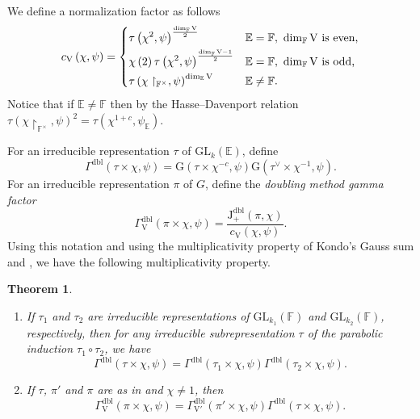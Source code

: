 \documentclass[12pt, reqno]{amsart}
\newtheorem{theorem}{Theorem}[section]
\theoremstyle{definition}
\theoremstyle{definition}
\theoremstyle{definition}
\newcommand{\multiplicativegroup}[1]{#1^{\times}}
\newcommand{\hermitianSpace}{\mathrm{V}}
\newcommand{\fieldCharacter}{\psi}
\newcommand{\Contragradient}[1]{#1^{\vee}}
\newcommand{\minusInvolution}[1]{#1^{-c}}
\newcommand{\involutionPlusOne}[1]{#1^{1+c}}
\newcommand{\GL}{\mathrm{GL}}
\newcommand{\finiteField}{\mathbb{F}}
\newcommand{\quadraticExtension}{\mathbb{E}}
\newcommand{\GaussSumScalar}[2]{\mathrm{G}\left(#1, #2\right)}
\newcommand{\posDblJacobiSumScalar}[2]{\mathrm{J}_{+}^{\mathrm{dbl}}\left(#1, #2\right)}
\newcommand{\dblGammaFactor}[3]{\Gamma^{\mathrm{dbl}}\left(#1 \times #2, #3\right)}
\newcommand{\dblGammaFactorSpace}[4]{\Gamma^{\mathrm{dbl}}_{#1}\left(#2 \times #3, #4\right)}
\begin{document}
We define a normalization factor as follows $$c_{\hermitianSpace}\left(\chi, \fieldCharacter\right) = \begin{dcases}
	\tau\left(\chi^2, \fieldCharacter\right)^{\frac{\dim_{\finiteField} \hermitianSpace}{2}} & \quadraticExtension = \finiteField,\,\, \dim_{\finiteField} \hermitianSpace \text{ is even,}\\
	\chi\left(2\right) \tau\left(\chi^2, \fieldCharacter\right)^{\frac{\dim_{\finiteField} \hermitianSpace - 1}{2}} & \quadraticExtension = \finiteField,\,\, \dim_{\finiteField} \hermitianSpace \text{ is odd,}	\\
	\tau\left(\chi\restriction_{\multiplicativegroup{\finiteField}}, \fieldCharacter\right)^{\dim_{\quadraticExtension} \hermitianSpace} & \quadraticExtension \ne \finiteField.
\end{dcases}$$
Notice that if $\quadraticExtension \ne \finiteField$ then by the Hasse--Davenport relation $\tau\left(\chi\restriction_{\multiplicativegroup{\finiteField}}, \fieldCharacter\right)^{2} = \tau\left(\involutionPlusOne{\chi}, \fieldCharacter_{\quadraticExtension}\right)$.

For an irreducible representation  $\tau$ of $\GL_k\left(\quadraticExtension\right)$, define $$\dblGammaFactor{\tau}{\chi}{\fieldCharacter} = \GaussSumScalar{\tau \times \minusInvolution{\chi}}{\fieldCharacter} \GaussSumScalar{\Contragradient{\tau} \times \chi^{-1}}{\fieldCharacter}.$$
For an irreducible representation $\pi$ of $G$, define the \emph{doubling method gamma factor} $$\dblGammaFactorSpace{\hermitianSpace}{\pi}{\chi}{\fieldCharacter} = \frac{\posDblJacobiSumScalar{\pi}{\chi}}{c_{\hermitianSpace}\left(\chi, \fieldCharacter\right)}.$$
Using this notation and using the multiplicativity property of Kondo's Gauss sum and , we have the following multiplicativity property.

\begin{theorem}\label{thm:multiplicativity-in-terms-of-gamma-factors}
	\begin{enumerate}
		\item If $\tau_1$ and $\tau_2$ are irreducible representations of $\GL_{k_1}\left(\finiteField\right)$ and $\GL_{k_2}\left(\finiteField\right)$, respectively, then for any irreducible subrepresentation $\tau$ of the parabolic induction $\tau_1 \circ \tau_2$, we have
		$$\dblGammaFactor{\tau}{\chi}{\fieldCharacter} = \dblGammaFactor{\tau_1}{\chi}{\fieldCharacter} \dblGammaFactor{\tau_2}{\chi}{\fieldCharacter}.$$
		\item If $\tau$, $\pi'$ and $\pi$ are as in  and $\chi \ne 1$, then
		$$\dblGammaFactorSpace{\hermitianSpace}{\pi}{\chi}{\fieldCharacter} = \dblGammaFactorSpace{\hermitianSpace'}{\pi'}{\chi}{\fieldCharacter} \dblGammaFactor{\tau}{\chi}{\fieldCharacter}.$$
	\end{enumerate}
\end{theorem}
\end{document}

